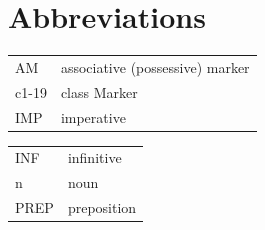 \documentclass[output=paper,modfonts,nonflat,
colorlinks, citecolor=brown,
]{langsci/langscibook}
\begin{document}
\section*{Abbreviations}
\begin{tabularx}{.55\textwidth}{ll}
AM & associative (possessive) marker \\
c1-19 & class Marker \\
IMP & imperative \\
\end{tabularx}
\begin{tabularx}{.45\textwidth}{ll}
INF & infinitive\\
n & noun\\
PREP & preposition\\
\end{tabularx}







\sloppy
\printbibliography[heading=subbibliography,notkeyword=this]
\end{document}
